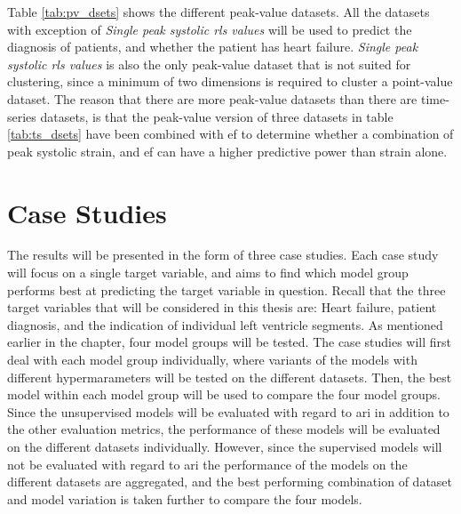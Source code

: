 Table \ref{tab:pv_dsets} shows the different peak-value datasets. 
All the datasets with exception of \textit{Single peak systolic \acrshort{rls} values} will be used to predict the diagnosis of patients, 
and whether the patient has heart failure. \textit{Single peak systolic \acrshort{rls} values} is also the only peak-value dataset that is not suited for clustering, 
since a minimum of two dimensions is required to cluster a point-value dataset. The reason that there are more peak-value datasets than there are time-series datasets, 
is that the peak-value version of three datasets in table \ref{tab:ts_dsets} have been combined with \acrshort{ef} to determine whether a combination of peak systolic strain,
and \acrshort{ef} can have a higher predictive power than strain alone.

\section{Case Studies}
The results will be presented in the form of three case studies. 
Each case study will focus on a single target variable, and aims to find which model group performs best at predicting the target variable in question.
Recall that the three target variables that will be considered in this thesis are: Heart failure, patient diagnosis, and the indication of individual left ventricle segments.
As mentioned earlier in the chapter, four model groups will be tested. 
The case studies will first deal with each model group individually, where variants of the models with different hypermarameters will be tested on the different datasets. 
Then, the best model within each model group will be used to compare the four model groups.
Since the unsupervised models will be evaluated with regard to \acrshort{ari} in addition to the other evaluation metrics,
the performance of these models will be evaluated on the different datasets individually.
However, since the supervised models will not be evaluated with regard to \acrshort{ari} the performance of the models on the different datasets are aggregated,
and the best performing combination of dataset and model variation is taken further to compare the four models.



